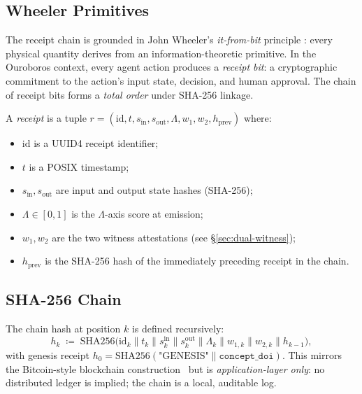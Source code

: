 \subsection{Wheeler Primitives}
\label{ssec:wheeler-primitives}

The receipt chain is grounded in John Wheeler's \emph{it-from-bit} principle
\cite{wheeler_1989}: every physical quantity derives from an information-theoretic
primitive.  In the Ouroboros context, every agent action produces a
\emph{receipt bit}: a cryptographic commitment to the action's input state,
decision, and human approval.  The chain of receipt bits forms a
\emph{total order} under SHA-256 linkage.

\begin{definition}[Receipt]
  \label{def:receipt-impl}
  A \emph{receipt} is a tuple \(r = (\mathrm{id}, t, s_{\mathrm{in}},
  s_{\mathrm{out}}, \Lambda, w_1, w_2, h_{\mathrm{prev}})\) where:
  \begin{itemize}
    \item \(\mathrm{id}\) is a UUID4 receipt identifier;
    \item \(t\) is a POSIX timestamp;
    \item \(s_{\mathrm{in}}, s_{\mathrm{out}}\) are input and output state
      hashes (SHA-256);
    \item \(\Lambda \in [0,1]\) is the \(\Lambda\)-axis score at emission;
    \item \(w_1, w_2\) are the two witness attestations (see
      \S\ref{sec:dual-witness});
    \item \(h_{\mathrm{prev}}\) is the SHA-256 hash of the immediately
      preceding receipt in the chain.
  \end{itemize}
\end{definition}

\subsection{SHA-256 Chain}
\label{ssec:sha256-chain}

The chain hash at position \(k\) is defined recursively:
\[
  h_k \;\coloneqq\; \mathrm{SHA256}\!\bigl(\mathrm{id}_k \| t_k \| 
    s^{\mathrm{in}}_k \| s^{\mathrm{out}}_k \| \Lambda_k \| 
    w_{1,k} \| w_{2,k} \| h_{k-1}\bigr),
\]
with genesis receipt \(h_0 = \mathrm{SHA256}(\text{"GENESIS"}\|
\texttt{concept\_doi})\).  This mirrors the Bitcoin-style blockchain
construction~\cite{nakamoto_2008} but is \emph{application-layer only}:
no distributed ledger is implied; the chain is a local, auditable log.

